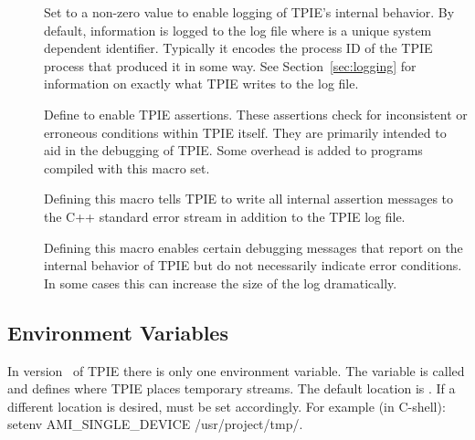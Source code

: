 \begin{description}
  
  \item[{}] Set to a non-zero value to
  enable logging of TPIE's internal behavior. By default, information is logged to the
  log file  where
   is a unique system dependent identifier.
  Typically it encodes the process ID of the TPIE process
  that produced it in some way. See
  Section~\ref{sec:logging} for information on exactly what
  TPIE writes to the log file.

  
  \item[{}] Define to enable TPIE
  assertions. These assertions check for inconsistent or
  erroneous conditions within TPIE itself. They are
  primarily intended to aid in the debugging of TPIE. Some
  overhead is added to programs compiled with this macro
  set.

  
  \item[{}] Defining this macro tells
  TPIE to write all internal assertion messages to the C++
  standard error stream  in addition to the
  TPIE log file.

 
 \item[{}] Defining this macro enables
 certain debugging messages that report on the internal
 behavior of TPIE but do not necessarily indicate error
 conditions. In some cases this can increase the size of the
 log dramatically.


\end{description}


\subsection{Environment Variables}

In version \version~of TPIE there is only one environment
variable. The variable is called
 and defines where TPIE places
temporary streams. The default location is
. If a different location is desired,
 must be set accordingly. For
example (in C-shell): setenv AMI\_SINGLE\_DEVICE
/usr/project/tmp/.  


